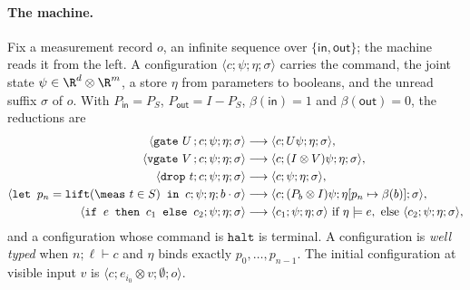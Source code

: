 \documentclass[acmsmall,screen,review,anonymous,nonacm]{acmart}
\begin{document}
\paragraph{The machine.} Fix a measurement record $o$, an infinite sequence over
$\{\mathsf{in}, \mathsf{out}\}$; the machine reads it from the left. A
configuration $\langle c; \psi; \eta; \sigma\rangle$ carries the command, the
joint state $\psi \in \R^{d} \otimes \R^{m}$, a store $\eta$ from parameters
to booleans, and the unread suffix $\sigma$ of $o$. With $P_{\mathsf{in}} =
P_S$, $P_{\mathsf{out}} = I - P_S$, $\beta(\mathsf{in}) = 1$ and
$\beta(\mathsf{out}) = 0$, the reductions are
\[
\begin{aligned}
 \langle \texttt{gate}\ U\,;c;\psi;\eta;\sigma\rangle
 &\longrightarrow \langle c;U\psi;\eta;\sigma\rangle,\\
 \langle \texttt{vgate}\ V\,;c;\psi;\eta;\sigma\rangle
 &\longrightarrow \langle c;(I \otimes V)\psi;\eta;\sigma\rangle,\\
 \langle \drop\ t;c;\psi;\eta;\sigma\rangle
 &\longrightarrow \langle c;\psi;\eta;\sigma\rangle,\\
 \langle \texttt{let }p_n=\lift(\meas\ t\in S)\texttt{ in }c;
          \psi;\eta;b\cdot\sigma\rangle
 &\longrightarrow
 \langle c;(P_b\otimes I)\psi;\eta[p_n\mapsto\beta(b)];\sigma\rangle,\\
 \langle \texttt{if } e \texttt{ then } c_1 \texttt{ else } c_2;
          \psi;\eta;\sigma\rangle
 &\longrightarrow \langle c_1;\psi;\eta;\sigma\rangle
   \ \text{if } \eta \models e, \ \text{else }
   \langle c_2;\psi;\eta;\sigma\rangle,
\end{aligned}
\]
and a configuration whose command is $\texttt{halt}$ is terminal. A
configuration is \emph{well typed} when $n;\ell \vdash c$ and $\eta$ binds
exactly $p_0, \ldots, p_{n-1}$. The initial configuration at visible input
$v$ is $\langle c; e_{i_0} \otimes v; \emptyset; o\rangle$.
\end{document}
